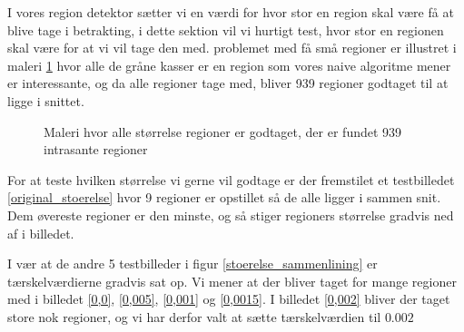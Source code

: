 {\sffamily
I vores region detektor sætter vi en værdi for hvor stor en region skal
være få at blive tage i betrakting, i dette sektion vil vi hurtigt test,
hvor stor en regionen skal være for at vi vil tage den med. problemet
med få små regioner er illustret i maleri \ref{alt_med} hvor alle de
gråne kasser er en region som vores naive algoritme mener er
interessante, og da alle regioner tage med, bliver 939 regioner godtaget
til at ligge i snittet. 
}

\begin{figure}[¡h]
    \setlength\fboxsep{0pt}
    \setlength\fboxrule{0.5pt}
    \begin{center}
    \end{center}
    \caption{Maleri hvor alle størrelse regioner er godtaget, der er fundet 939 intrasante regioner}
	\label{alt_med}
\end{figure}
For at teste hvilken størrelse vi gerne vil godtage er der fremstilet et
testbilledet \ref{original_stoerelse} hvor 9 regioner er opstillet så de
alle ligger i sammen snit. Dem øvereste regioner er den minste, og så
stiger regioners størrelse gradvis ned af i billedet.

I vær at de andre 5 testbilleder i figur \ref{stoerelse_sammenlining} er
tærskelværdierne gradvis sat op. Vi mener at der bliver taget for mange
regioner med i billedet \ref{0,0}, \ref{0,005}, \ref{0,001} og
\ref{0,0015}. I billedet \ref{0,002} bliver der taget store nok
regioner, og vi har derfor valt at sætte tærskelværdien til $0.002$
 

